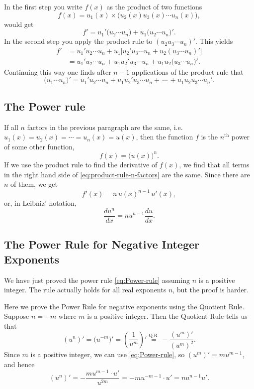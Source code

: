 In the first step you write $f(x)$ as the product of two functions
\[
f(x) = u_1(x) \times \bigl(u_2(x)u_3(x)\cdots u_n(x)\bigr),
\]
would get
\[
f' = u_1' \bigl(u_2\cdots u_n\bigr) + u_1\bigl(u_2\cdots u_n\bigr)'.
\]
In the second step you apply the product rule to $(u_2u_3\cdots
u_n)'$.  This yields
\begin{align*}
  f' 
  &= u_1' u_2\cdots u_n + u_1\bigl[u_2'u_3\cdots u_n+u_2(u_3\cdots
  u_n)'\bigr]\\
  &= u_1'u_2\cdots u_n + u_1u_2'u_3\cdots u_n + u_1u_2\bigl(u_3\cdots
  u_n\bigr)'.
\end{align*}
Continuing this way one finds after $n-1$ applications of the product rule
that
\begin{equation}
  \label{eq:product-rule-n-factors}
  \bigl(u_1\cdots u_n\bigr)'
  = u_1'u_2\cdots u_n + u_1u_2'u_3\cdots u_n +\, \cdots\, + u_1u_2u_3\cdots 
  u_n'.
\end{equation}


\subsection{The Power rule}
If all $n$ factors in the previous paragraph are the same, i.e.\ $u_1(x) =
u_2(x) = \cdots = u_n(x) = u(x)$, then the function $f$ is the
$n^{\text{th}}$ power of some other function,
\[
f(x) = \bigl(u(x)\bigr)^n.
\]
If we use the product rule to find the derivative of $f(x)$, we find that
all terms in the right hand side of \eqref{eq:product-rule-n-factors} are
the same.  Since there are $n$ of them, we get
\[
f'(x) = n\, u(x)^{n-1}\, u'(x),
\]
or, in Leibniz' notation,
\begin{equation}
  \label{eq:Power-rule}
  \frac{du^n}{dx} = nu^{n-1}\frac{du}{dx}.
\end{equation}



\subsection{The Power Rule for Negative Integer Exponents}
We have just proved the power rule \eqref{eq:Power-rule} assuming $n$ is a
positive integer.  The rule actually holds for all real exponents $n$, but
the proof is harder.  

Here we prove the Power Rule for negative exponents using the Quotient
Rule.  Suppose $n=-m$ where $m$ is a positive integer.   Then the Quotient
Rule tells us that
\[
(u^n)'
=\bigl(u^{-m}\bigr)'
=\left(\frac{1}{u^m}\right)' 
\stackrel{\text{Q.R.}}{=}
-\frac{(u^m)'}{(u^m)^2}.
\]
Since $m$ is a positive integer, we can use \eqref{eq:Power-rule}, so
$(u^m)' = mu^{m-1}$, and hence
\[
(u^n)' 
= -\frac{mu^{m-1}\cdot u'}{u^{2m}}
=-mu^{-m-1}\cdot u'
= n u^{n-1}u'.
\]


